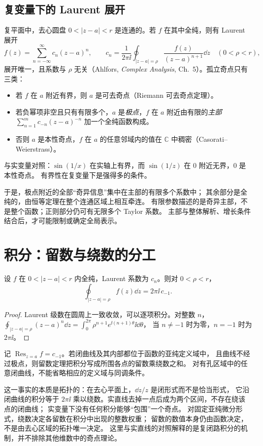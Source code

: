\documentclass[11pt]{article}
\DeclareMathOperator{\Res}{Res}
\begin{document}
\subsection{复变量下的 Laurent 展开}
复平面中，去心圆盘 $0<|z-a|<r$ 是连通的。若 $f$ 在其中全纯，则有 Laurent 展开
\[
 f(z)=\sum_{n=-\infty}^{\infty}c_n(z-a)^n,\qquad
 c_n=\frac1{2\pi\ii}\oint_{|z-a|=\rho}\frac{f(z)}{(z-a)^{n+1}}\dd z\quad(0<\rho<r),
\]
展开唯一，且系数与 $\rho$ 无关（Ahlfors, \emph{Complex Analysis}, Ch.~5）。孤立奇点只有三类：
\begin{itemize}
 \item 若 $f$ 在 $a$ 附近有界，则 $a$ 是可去奇点（Riemann 可去奇点定理）。
 \item 若负幂项非空且只有有限多个，$a$ 是\emph{极点}，$f$ 在 $a$ 附近由有限的\emph{主部}
 $\sum_{n=1}^mc_{-n}(z-a)^{-n}$ 加一个全纯函数构成。
 \item 否则 $a$ 是本性奇点，$f$ 在 $a$ 的任意邻域内的值在 $\mathbb C$ 中稠密（Casorati--Weierstrass）。
\end{itemize}
与实变量对照：$\sin(1/x)$ 在实轴上有界，而 $\sin(1/z)$ 在 $0$ 附近无界，$0$ 是本性奇点。
有界性在复变量下是强得多的条件。

于是，极点附近的全部“奇异信息”集中在主部的有限多个系数中；
其余部分是全纯的，由恒等定理在整个连通区域上相互牵连。
有限参数描述的是奇异主部，不是整个函数；正则部分仍可有无限多个 Taylor 系数。
主部与整体解析、增长条件结合后，才可能限制或确定全局表示。

\section{积分：留数与绕数的分工}
\begin{proposition}\label{prop:residue}
设 $f$ 在 $0<|z-a|<r$ 内全纯，Laurent 系数为 $c_n$。则对 $0<\rho<r$，
\[
 \oint_{|z-a|=\rho}f(z)\dd z=2\pi\ii\,c_{-1}.
\]
\end{proposition}
\begin{proof}
Laurent 级数在圆周上一致收敛，可以逐项积分。对整数 $n$，
$\oint_{|z-a|=\rho}(z-a)^n\dd z=\int_0^{2\pi}\rho^{n+1}e^{\ii(n+1)\theta}\ii\dd\theta$，
当 $n\ne-1$ 时为零，$n=-1$ 时为 $2\pi\ii$。
\end{proof}
记 $\Res_{z=a}f=c_{-1}$。若闭曲线及其内部都位于函数的亚纯定义域中，
且曲线不经过极点，则留数定理把积分写成所围各点的留数乘绕数之和。
对有孔区域中的任意闭曲线，不能省略相应的定义域与同调条件。

这一事实的本质是拓扑的：在去心平面上，$\dd z/z$ 是闭形式而不是恰当形式，
它沿闭曲线的积分等于 $2\pi\ii$ 乘以绕数。实直线去掉一点后成为两个区间，不存在绕该点的闭曲线；
实变量下没有任何积分能够“包围”一个奇点。
对固定亚纯微分形式，绕数决定各留数在积分中出现的整数权重；
留数的数值本身仍由函数决定，不是由去心区域的拓扑唯一决定。
这里与实直线的对照解释的是复闭路积分的机制，并不排除其他维数中的奇点理论。
\end{document}
